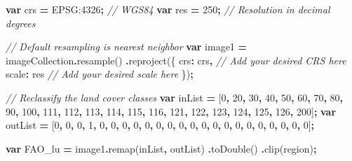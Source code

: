 \documentclass[
  10pt,
  b5paper,
  oneside]{book}
\newenvironment{Shaded}{\begin{snugshade}}{\end{snugshade}}
\newcommand{\CommentTok}[1]{\textcolor[rgb]{0.56,0.35,0.01}{\textit{#1}}}
\newcommand{\DataTypeTok}[1]{\textcolor[rgb]{0.13,0.29,0.53}{#1}}
\newcommand{\DecValTok}[1]{\textcolor[rgb]{0.00,0.00,0.81}{#1}}
\newcommand{\FunctionTok}[1]{\textcolor[rgb]{0.00,0.00,0.00}{#1}}
\newcommand{\KeywordTok}[1]{\textcolor[rgb]{0.13,0.29,0.53}{\textbf{#1}}}
\newcommand{\NormalTok}[1]{#1}
\newcommand{\OperatorTok}[1]{\textcolor[rgb]{0.81,0.36,0.00}{\textbf{#1}}}
\newcommand{\StringTok}[1]{\textcolor[rgb]{0.31,0.60,0.02}{#1}}
\begin{document}
\begin{Shaded}
\begin{Highlighting}[]
\KeywordTok{var}\NormalTok{ crs }\OperatorTok{=} \StringTok{\textquotesingle{}EPSG:4326\textquotesingle{}}\OperatorTok{;} \CommentTok{// WGS84}
\KeywordTok{var}\NormalTok{ res }\OperatorTok{=} \DecValTok{250}\OperatorTok{;} \CommentTok{// Resolution in decimal degrees}

\CommentTok{// Default resampling is nearest neighbor}
\KeywordTok{var}\NormalTok{ image1 }\OperatorTok{=}\NormalTok{ imageCollection}\OperatorTok{.}\FunctionTok{resample}\NormalTok{()}
  \OperatorTok{.}\FunctionTok{reproject}\NormalTok{(\{}
    \DataTypeTok{crs}\OperatorTok{:}\NormalTok{ crs}\OperatorTok{,} \CommentTok{// Add your desired CRS here}
    \DataTypeTok{scale}\OperatorTok{:}\NormalTok{ res }\CommentTok{// Add your desired scale here}
\NormalTok{  \})}\OperatorTok{;}

\CommentTok{// Reclassify the land cover classes}
\KeywordTok{var}\NormalTok{ inList }\OperatorTok{=}\NormalTok{ [}\DecValTok{0}\OperatorTok{,} \DecValTok{20}\OperatorTok{,} \DecValTok{30}\OperatorTok{,} \DecValTok{40}\OperatorTok{,} \DecValTok{50}\OperatorTok{,} \DecValTok{60}\OperatorTok{,} \DecValTok{70}\OperatorTok{,} \DecValTok{80}\OperatorTok{,} \DecValTok{90}\OperatorTok{,} \DecValTok{100}\OperatorTok{,} \DecValTok{111}\OperatorTok{,} \DecValTok{112}\OperatorTok{,} \DecValTok{113}\OperatorTok{,} \DecValTok{114}\OperatorTok{,} \DecValTok{115}\OperatorTok{,} \DecValTok{116}\OperatorTok{,} 
              \DecValTok{121}\OperatorTok{,} \DecValTok{122}\OperatorTok{,} \DecValTok{123}\OperatorTok{,} \DecValTok{124}\OperatorTok{,} \DecValTok{125}\OperatorTok{,} \DecValTok{126}\OperatorTok{,} \DecValTok{200}\NormalTok{]}\OperatorTok{;}
\KeywordTok{var}\NormalTok{ outList }\OperatorTok{=}\NormalTok{ [}\DecValTok{0}\OperatorTok{,} \DecValTok{0}\OperatorTok{,} \DecValTok{0}\OperatorTok{,} \DecValTok{1}\OperatorTok{,} \DecValTok{0}\OperatorTok{,} \DecValTok{0}\OperatorTok{,} \DecValTok{0}\OperatorTok{,} \DecValTok{0}\OperatorTok{,} \DecValTok{0}\OperatorTok{,} \DecValTok{0}\OperatorTok{,} \DecValTok{0}\OperatorTok{,} \DecValTok{0}\OperatorTok{,} \DecValTok{0}\OperatorTok{,} \DecValTok{0}\OperatorTok{,} \DecValTok{0}\OperatorTok{,} \DecValTok{0}\OperatorTok{,} \DecValTok{0}\OperatorTok{,} \DecValTok{0}\OperatorTok{,} \DecValTok{0}\OperatorTok{,} \DecValTok{0}\OperatorTok{,} \DecValTok{0}\OperatorTok{,} \DecValTok{0}\OperatorTok{,} \DecValTok{0}\NormalTok{]}\OperatorTok{;}

\KeywordTok{var}\NormalTok{ FAO\_lu }\OperatorTok{=}\NormalTok{ image1}\OperatorTok{.}\FunctionTok{remap}\NormalTok{(inList}\OperatorTok{,}\NormalTok{ outList)}
  \OperatorTok{.}\FunctionTok{toDouble}\NormalTok{()}
  \OperatorTok{.}\FunctionTok{clip}\NormalTok{(region)}\OperatorTok{;}


\end{Highlighting}
\end{Shaded}
\end{document}
